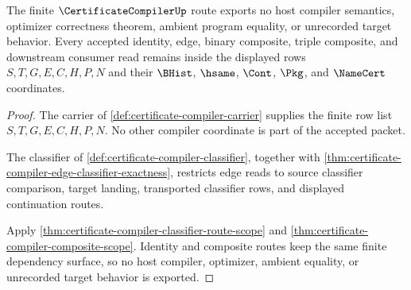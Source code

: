 \begin{theorem}
\label{thm:certificate-compiler-finite-route-non-escape}
The finite $\CertificateCompilerUp$ route exports no host compiler semantics,
optimizer correctness theorem, ambient program equality, or unrecorded target
behavior. Every accepted identity, edge, binary composite, triple composite,
and downstream consumer read remains inside the displayed rows
$S,T,G,E,C,H,P,N$ and their $\BHist$, $\hsame$, $\Cont$, $\Pkg$, and
$\NameCert$ coordinates.
\end{theorem}
\begin{proof}
The carrier of \autoref{def:certificate-compiler-carrier} supplies the finite
row list $S,T,G,E,C,H,P,N$. No other compiler coordinate is part of the
accepted packet.

The classifier of \autoref{def:certificate-compiler-classifier}, together
with \autoref{thm:certificate-compiler-edge-classifier-exactness}, restricts
edge reads to source classifier comparison, target landing, transported
classifier rows, and displayed continuation routes.

Apply \autoref{thm:certificate-compiler-classifier-route-scope} and
\autoref{thm:certificate-compiler-composite-scope}. Identity and composite
routes keep the same finite dependency surface, so no host compiler,
optimizer, ambient equality, or unrecorded target behavior is exported.
\end{proof}







